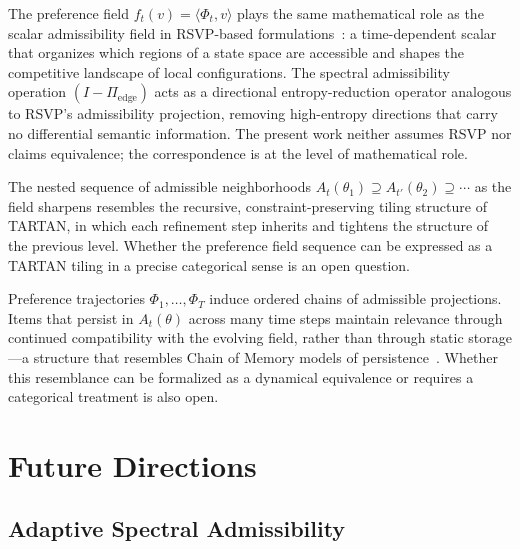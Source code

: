 \documentclass[12pt, a4paper]{article}
\theoremstyle{plain}
\theoremstyle{definition}
\begin{document}
The preference field $f_t(v) = \langle \Phi_t, v \rangle$ plays the same
mathematical role as the scalar admissibility field in RSVP-based
formulations~\cite{rsvp2024}: a time-dependent scalar that organizes which
regions of a state space are accessible and shapes the competitive landscape
of local configurations. The spectral admissibility operation $(I -
\Pi_\mathrm{edge})$ acts as a directional entropy-reduction operator
analogous to RSVP's admissibility projection, removing high-entropy
directions that carry no differential semantic information. The present
work neither assumes RSVP nor claims equivalence; the correspondence is at
the level of mathematical role.

The nested sequence of admissible neighborhoods $A_t(\theta_1) \supseteq
A_{t'}(\theta_2) \supseteq \cdots$ as the field sharpens resembles the
recursive, constraint-preserving tiling structure of TARTAN, in which each
refinement step inherits and tightens the structure of the previous level.
Whether the preference field sequence can be expressed as a TARTAN tiling
in a precise categorical sense is an open question.

Preference trajectories $\Phi_1, \ldots, \Phi_T$ induce ordered chains of
admissible projections. Items that persist in $A_t(\theta)$ across many
time steps maintain relevance through continued compatibility with the
evolving field, rather than through static storage---a structure that
resembles Chain of Memory models of persistence~\cite{chainofmemory2024}.
Whether this resemblance can be formalized as a dynamical equivalence or
requires a categorical treatment is also open.

\section{Future Directions}
\label{sec:future}

\subsection{Adaptive Spectral Admissibility}
\end{document}
